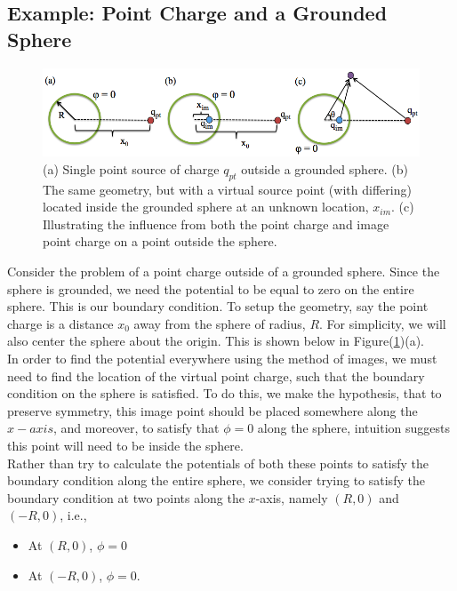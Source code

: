 %
%
\subsection{Example: Point Charge and a Grounded Sphere}

\begin{figure}[h!]
\centering
\includegraphics[width=6.25in]{moi_geo2.png}
\caption{(a) Single point source of charge $q_{pt}$ outside a grounded sphere. (b) The same geometry, but with a virtual source point (with differing) located inside the grounded sphere at an unknown location, $x_{im}$. (c) Illustrating the influence from both the point charge and image point charge on a point outside the sphere.}
\label{MOI_geo2}
\end{figure}

Consider the problem of a point charge outside of a grounded sphere.  Since the sphere is grounded, we need the potential to be equal to zero on the entire sphere. This is our boundary condition. To setup the geometry, say the point charge is a distance $x_0$ away from the sphere of radius, $R$.  For simplicity, we will also center the sphere about the origin. This is shown below in Figure(\ref{MOI_geo2})(a). \\ 

In order to find the potential everywhere using the method of images, we must need to find the location of the virtual point charge, such that the boundary condition on the sphere is satisfied. To do this, we make the hypothesis, that to preserve symmetry, this image point should be placed somewhere along the $x-axis$, and moreover, to satisfy that $\phi = 0$ along the sphere, intuition suggests this point will need to be inside the sphere.\\

Rather than try to calculate the potentials of both these points to satisfy the boundary condition along the entire sphere, we consider trying to satisfy the boundary condition at two points along the $x$-axis, namely $(R,0)$ and $(-R,0)$, i.e.,

\begin{itemize}
\item At $(R,0)$, $\phi = 0$
\item At $(-R,0)$, $\phi=0.$
\end{itemize}

